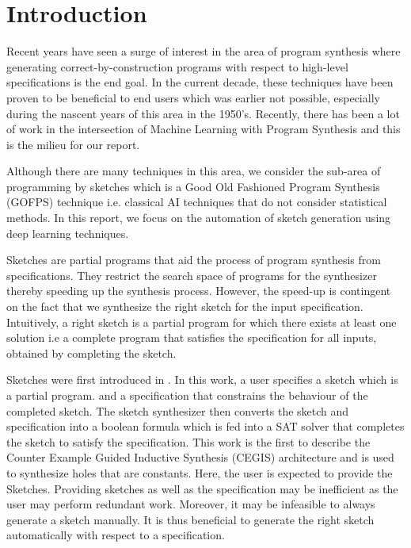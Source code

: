 
\section{Introduction}
\label{sec:intro}

Recent years have seen a surge of interest in the area of program synthesis where generating correct-by-construction programs with respect to high-level specifications is the end goal. In the current decade, these techniques have been proven to be beneficial to end users which was earlier not possible, especially during the nascent years of this area in the 1950's. Recently, there has been a lot of work in the intersection of Machine Learning with Program Synthesis and this is the milieu for our report.

Although there are many techniques in this area, we consider the sub-area of programming by sketches  which is a Good Old Fashioned Program Synthesis (GOFPS) technique i.e.  classical AI techniques that do not consider statistical methods.  In this report, we focus on the automation of sketch generation using deep learning techniques.

Sketches are partial programs that aid the process of program synthesis from specifications. They restrict the search space of programs for the synthesizer thereby speeding up the synthesis process. However, the speed-up is contingent on the fact that we synthesize the right sketch for the input specification. Intuitively, a  right sketch is a partial program for which there exists at least one solution i.e a complete program that satisfies the specification for all inputs, obtained by completing the sketch.

Sketches were first introduced in \cite{10.5555/1714168}. In this work, a user specifies a sketch which is a partial program. and a specification that constrains the behaviour of the completed sketch. The sketch synthesizer then converts the sketch and specification into a boolean formula which is fed into a SAT solver that completes the sketch to satisfy the specification. This work is the first to describe the Counter Example Guided Inductive Synthesis (CEGIS) architecture and is used to synthesize holes that are constants. Here, the user is expected to provide the Sketches. Providing sketches as well as the specification may be inefficient as the user may perform redundant work. Moreover, it may be infeasible to always generate a sketch manually. It is thus beneficial to generate the right sketch automatically with respect to a specification.

